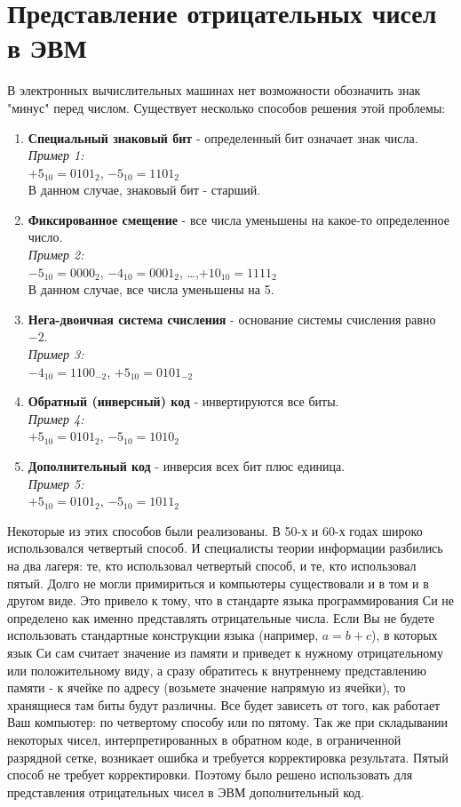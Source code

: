 \section{Представление отрицательных чисел в ЭВМ}

В электронных вычислительных машинах нет возможности обозначить знак "минус" перед числом. Существует несколько способов решения этой проблемы:
\begin{enumerate}
\item \textbf{Специальный знаковый бит} - определенный бит означает знак числа.
\\\emph{Пример 1:}
\\$+5_{10} = 0101_{2}$, $-5_{10} = 1101_{2}$
\\В данном случае, знаковый бит - старший.
\item \textbf{Фиксированное смещение} - все числа уменьшены на какое-то определенное число.
\\\emph{Пример 2:}
\\$-5_{10} = 0000_{2}$, $-4_{10} = 0001_{2}$, \dots ,$+10_{10} = 1111_{2}$
\\В данном случае, все числа уменьшены на 5.
\item \textbf{Нега-двоичная система счисления} - основание системы счисления равно $-2$.
\\\emph{Пример 3:}
\\$-4_{10} = 1100_{-2}$, $+5_{10} = 0101_{-2}$
\item \textbf{Обратный (инверсный) код} - инвертируются все биты.
\\\emph{Пример 4:}
\\$+5_{10} = 0101_{2}$, $-5_{10} = 1010_{2}$
\item \textbf{Дополнительный код} - инверсия всех бит плюс единица.
\\\emph{Пример 5:}
\\$+5_{10} = 0101_{2}$, $-5_{10} = 1011_{2}$
\end{enumerate}

Некоторые из этих способов были реализованы. В 50-х и 60-х годах широко использовался четвертый способ. И специалисты теории информации разбились на два лагеря: те, кто использовал четвертый способ, и те, кто использовал пятый. Долго не могли примириться и компьютеры существовали и в том и в другом виде. Это привело к тому, что в стандарте языка программирования Си не определено как именно представлять отрицательные числа. Если Вы не будете использовать стандартные конструкции языка (например, $a = b + c$), в которых язык Си сам считает значение из памяти и приведет к нужному отрицательному или положительному виду, а сразу обратитесь к внутреннему представлению памяти - к ячейке по адресу (возьмете значение напрямую из ячейки), то хранящиеся там биты будут различны. Все будет зависеть от того, как работает Ваш компьютер: по четвертому способу или по пятому. Так же при складывании некоторых чисел, интерпретированных в обратном коде, в ограниченной разрядной сетке, возникает ошибка и требуется корректировка результата. Пятый способ не требует корректировки. Поэтому было решено использовать для представления отрицательных чисел в ЭВМ дополнительный код.


